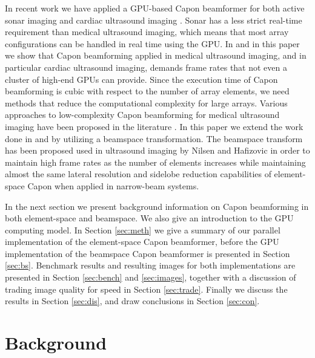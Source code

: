 \documentclass[journal]{IEEEtran}
\begin{document}
In recent work we have applied a GPU-based Capon beamformer for both active sonar imaging \cite{Buskenes, Buskenes2013} and cardiac ultrasound imaging \cite{asen2012}. Sonar has a less strict real-time requirement than medical ultrasound imaging, which means that most array configurations can be handled in real time using the GPU. In \cite{asen2012} and in this paper we show that Capon beamforming applied in medical ultrasound imaging, and in particular cardiac ultrasound imaging, demands frame rates that not even a cluster of high-end GPUs can provide. Since the execution time of Capon beamforming is cubic with respect to the number of array elements, we need methods that reduce the computational complexity for large arrays. Various approaches to low-complexity Capon beamforming for medical ultrasound imaging have been proposed in the literature \cite{Synnevag2011, Asl2012, Jensen2012, Kim}. In this paper we extend the work done in \cite{asen2012} and \cite{Buskenes2013} by utilizing a beamspace transformation. The beamspace transform has been proposed used in ultrasound imaging by Nilsen and Hafizovic \cite{Nilsen2009} in order to maintain high frame rates as the number of elements increases while maintaining almost the same lateral resolution and sidelobe reduction capabilities of element-space Capon when applied in narrow-beam systems.

In the next section we present background information on Capon beamforming in both element-space and beamspace. We also give an introduction to the GPU computing model. In Section \ref{sec:meth} we give a summary of our parallel implementation of the element-space Capon beamformer, before the GPU implementation of the beamspace Capon beamformer is presented in Section \ref{sec:bs}. Benchmark results and resulting images for both implementations are presented in Section \ref{sec:bench} and \ref{sec:images}, together with a discussion of trading image quality for speed in Section \ref{sec:trade}. Finally we discuss the results in Section \ref{sec:dis}, and draw conclusions in Section \ref{sec:con}. 

\section{Background}\label{background}
\end{document}
